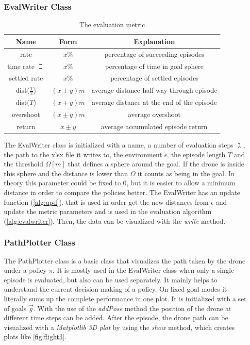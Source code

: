 \subsubsection{EvalWriter Class} \label{sec:evalw}
\begin{table}
	\centering
	\caption{The evaluation metric}\label{tab:evalmetric}
	\begin{tabular}{c|c|c}
		Name & Form & Explanation\\
		\hline
		rate & $x \%$ & percentage of succeeding episodes\\
		time rate $\beth$ & $x\%$ & percentage of time in goal sphere\\
		settled rate & $x\%$ & percentage of settled episodes\\
		dist($\frac{T}{2}$) & $(x \pm y) m $& average distance half way through episode\\
		dist($T$) &  $(x \pm y) m $ & average distance at the end of the episode\\
		overshoot & $(x \pm y) m $ & average overshoot\\
		return & $x \pm y $ & average accumulated episode return
	\end{tabular}
\end{table}

The EvalWriter class is initialized with a name, a number of evaluation steps $\gimel$, the path to the xlsx file it writes to, 
the environment $\epsilon$, the episode length  $T$ and the threshold $\Omega[m]$ that defines a sphere around the goal. 
If the drone is inside this sphere and the distance is lower than $\Omega$ it counts as being in the goal. 
In theory this parameter could be fixed to 0, but it is easier to allow a minimum distance in order to compare the policies better.
The EvalWriter has  an update function (\cref{alg:upd}), that is used in order get the new distances from $\epsilon$ 
and update the metric parameters and is used in the evaluation algorithm (\cref{alg:evalwriter}). Then, the data can be visualized with the \emph{write} method.

\subsubsection{PathPlotter Class}
The PathPlotter class is a basic class that visualizes the path taken by the drone under a policy $\pi$. 
It is mostly used in the EvalWriter class when only a single episode is evaluated, but also can be used separately.
It mainly helps to understand the current decision-making of a policy. On fixed goal modes it literally sums up the complete performance in one plot.
It is initialized with a set of goals $\overrightarrow{g}$. With the use of the \emph{addPose} method the position 
of the drone at different time steps can be added. 
After the episode, the drone path can be visualized with a \emph{Matplotlib 3D plot} by using the \emph{show} method, which creates plots like \cref{fig:flight3}.

